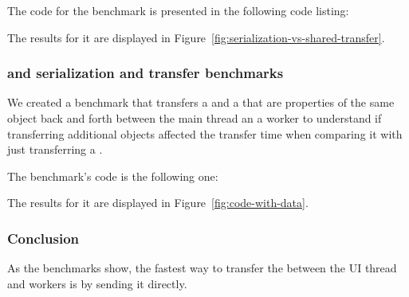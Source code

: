 The code for the benchmark is presented in the following code listing:

The results for it are displayed in Figure~\ref{fig:serialization-vs-shared-transfer}.

\subsubsection{\tstring{} and \ttarray{} serialization and transfer benchmarks}
We created a benchmark that transfers a \ttarray{} and a \tstring{} that are properties of the same object back and forth between the main thread an a worker to understand if transferring additional objects affected the transfer time when comparing it with just transferring a \tstring{}.

The benchmark's code is the following one:

The results for it are displayed in Figure~\ref{fig:code-with-data}.

\subsubsection{Conclusion}
As the benchmarks show, the fastest way to transfer the \tstring{} between the UI thread and workers is by sending it directly.

\pagebreak